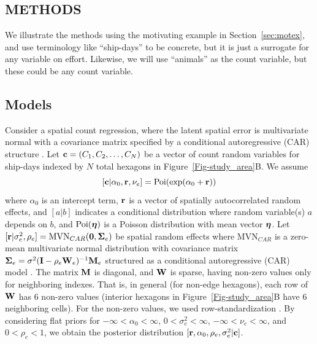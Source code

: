 \documentclass[11pt, titlepage]{article}
\begin{document}
\begin{spacing}{1.9}
\begin{flushleft}
\section{METHODS}

We illustrate the methods using the motivating example in Section~\ref{sec:motex}, and use terminology like ``ship-days'' to be concrete, but it is just a surrogate for any variable on effort.  Likewise, we will use ``animals'' as the count variable, but these could be any count variable.


\subsection{Models}

Consider a spatial count regression, where the latent spatial error is multivariate normal with a covariance matrix specified by a conditional autoregressive (CAR) structure \citep[e.g.,][]{VerHoefEtAl2018Spatialautoregressivemodels36}.  Let $\mathbf{c} = (C_{1}, C_{2}, \ldots, C_{N})$ be a vector of count random variables for ship-days indexed by $N$ total hexagons in Figure~\ref{Fig-study_area}B.  We assume
\begin{equation} \label{eq:poireg}
  [\mathbf{c}|\alpha_{0},\mathbf{r},\nu_{e}] = \textrm{Poi}(\exp(\alpha_{0} + \mathbf{r}))
\end{equation}
where $\alpha_{0}$ is an intercept term, $\mathbf{r}$ is a vector of spatially autocorrelated random effects, and $[a|b]$ indicates a conditional distribution where random variable(s) $a$ depends on $b$, and $\textrm{Poi}(\mbox{\boldmath $\eta$})$ is a Poisson distribution with mean vector $\mbox{\boldmath $\eta$}$. Let $[\mathbf{r}|\sigma^{2}_{e}, \rho_{e}] = \textrm{MVN}_{CAR}(\mathbf{0},\mbox{\boldmath $\Sigma$}_{e})$ be spatial random effects where $\textrm{MVN}_{CAR}$ is a zero-mean multivariate normal distribution with covariance matrix $\mbox{\boldmath $\Sigma$}_{e} = \sigma^{2}(\mathbf{I} - \rho_{e}\mathbf{W}_{e})^{-1}\mathbf{M}_{e}$ structured as a conditional autoregressive (CAR) model \citep{Besag1974SpatialInteractionStatistical192}.  The matrix $\mathbf{M}$ is diagonal, and $\mathbf{W}$ is sparse, having non-zero values only for neighboring indexes.  That is, in general (for non-edge hexagons), each row of $\mathbf{W}$ has 6 non-zero values (interior hexagons in Figure~\ref{Fig-study_area}B have 6 neighboring cells).  For the non-zero values, we used row-standardization \citep{VerHoefEtAl2018Spatialautoregressivemodels36}.  By considering flat priors for $-\infty < \alpha_{0} < \infty$, $0 < \sigma^{2}_{e} < \infty$, $-\infty < \nu_{e} < \infty$, and $0 < \rho_{e} < 1$, we obtain the posterior distribution $[\mathbf{r}, \alpha_{0}, \rho_{e}, \sigma^{2}_{e}|\mathbf{c}]$.


\end{flushleft}
\end{spacing}
\end{document}
